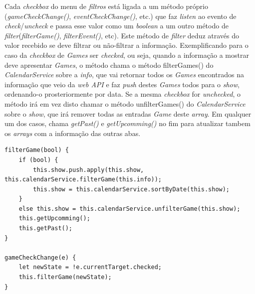Cada \textit{checkbox} do menu de \textit{filtros} está ligada a um método próprio (\textit{gameCheckChange()}, \textit{eventCheckChange()}, etc.) que faz \textit{listen} ao evento de \textit{check}/\textit{uncheck} e passa esse valor como um \textit{boolean} a um outro método de \textit{filter}(\textit{filterGame()}, \textit{filterEvent()}, etc). Este método de \textit{filter} deduz através do valor recebido se deve filtrar ou não-filtrar a informação. Exemplificando para o caso da \textit{checkbox} de \textit{Games} ser \textit{checked}, ou seja, quando a informação a mostrar deve apresentar \textit{Games}, o método chama o método filterGames() do \textit{CalendarService} sobre a \textit{info}, que vai retornar todos os \textit{Games} encontrados na informação que veio da \textit{web API} e faz \textit{push} destes \textit{Games} todos para o \textit{show}, ordenando-o prosteriormente por data. Se a mesma \textit{checkbox} for \textit{unchecked}, o método irá em vez disto chamar o método unfilterGames() do \textit{CalendarService} sobre o \textit{show}, que irá remover todas as entradas \textit{Game} deste \textit{array}. Em qualquer um dos casos, chama \textit{getPast()} e \textit{getUpcomming()} no fim para atualizar tambem os \textit{arrays} com a informação das outras abas.

\begin{lstlisting}
filterGame(bool) {
	if (bool) {
		this.show.push.apply(this.show, this.calendarService.filterGame(this.info));
		this.show = this.calendarService.sortByDate(this.show);
	}
	else this.show = this.calendarService.unfilterGame(this.show);
	this.getUpcomming();
	this.getPast();
}

gameCheckChange(e) {
	let newState = !e.currentTarget.checked;
	this.filterGame(newState);
}
\end{lstlisting}

